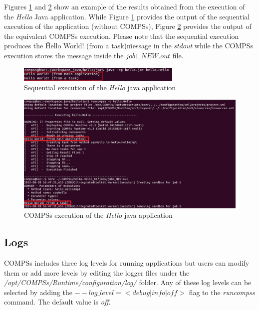 Figures \ref{fig:hello_seq} and \ref{fig:hello_compss} show an example of the results obtained from the execution of the \textit{Hello} Java 
 application. While Figure \ref{fig:hello_seq} provides the output of the sequential execution of the application (without COMPSs), Figure \ref{fig:hello_compss}
provides the output of the equivalent COMPSs execution. Please note that the sequential execution produces the \" Hello World! (from a task)\" message
in the \textit{stdout} while the COMPSs execution stores the message inside the \textit{$job1\_NEW.out$} file.
\begin{figure}[h!]
  \centering
    \includegraphics[width=0.7\textwidth]{./Sections/3_Results_and_Logs/Figures/hello_seq_stdout.jpeg}
    \caption{Sequential execution of the \textit{Hello} java application}
    \label{fig:hello_seq}
\end{figure}

\begin{figure}[h!]
  \centering
    \includegraphics[width=\textwidth]{./Sections/3_Results_and_Logs/Figures/hello_compss_stdout_and_job.jpeg}
    \caption{COMPSs execution of the \textit{Hello} java application}
    \label{fig:hello_compss}
\end{figure}
\newpage

\subsection{Logs}
COMPSs includes three log levels for running applications but users can modify them or add more levels by editing the
logger files under the \textit{/opt/COMPSs/Runtime/configuration/log/} folder. Any of these log levels can be selected by 
adding the \textit{$--log\_level=<debug | info | off >$} flag to the \textit{runcompss} command. The default value is \textit{off}.

